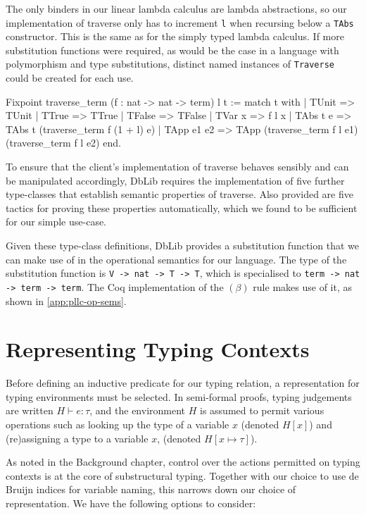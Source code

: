 \documentclass[]{unswthesis}
\let\c\texttt
\begin{document}
The only binders in our linear lambda calculus are lambda abstractions, so our implementation of traverse only has to increment \c{l} when recursing below a \c{TAbs} constructor. This is the same as for the simply typed lambda calculus. If more substitution functions were required, as would be the case in a language with polymorphism and type substitutions, distinct named instances of \c{Traverse} could be created for each use.

\begin{coqcode}
Fixpoint traverse_term (f : nat -> nat -> term) l t :=
  match t with
  | TUnit => TUnit
  | TTrue => TTrue
  | TFalse => TFalse
  | TVar x =>
      f l x
  | TAbs t e =>
      TAbs t (traverse_term f (1 + l) e)
  | TApp e1 e2 =>
      TApp (traverse_term f l e1) (traverse_term f l e2)
  end.
\end{coqcode}

To ensure that the client's implementation of traverse behaves sensibly and can be manipulated accordingly, DbLib requires the implementation of five further type-classes that establish semantic properties of traverse. Also provided are five tactics for proving these properties automatically, which we found to be sufficient for our simple use-case.

Given these type-class definitions, DbLib provides a substitution function that we can make use of in the operational semantics for our language. The type of the substitution function is \c{V -> nat -> T -> T}, which is specialised to \c{term -> nat -> term -> term}. The Coq implementation of the $(\beta)$ rule makes use of it, as shown in \cref{app:pllc-op-sems}.

\section{Representing Typing Contexts}
\label{sec:repr-ty-contexts}

Before defining an inductive predicate for our typing relation, a representation for typing environments must be selected. In semi-formal proofs, typing judgements are written $H \vdash e : \tau$, and the environment $H$ is assumed to permit various operations such as looking up the type of a variable $x$ (denoted $H[x]$) and (re)assigning a type to a variable $x$, (denoted $H[x \mapsto \tau]$).

As noted in the Background chapter, control over the actions permitted on typing contexts is at the core of substructural typing. Together with our choice to use de Bruijn indices for variable naming, this narrows down our choice of representation. We have the following options to consider:
\end{document}
